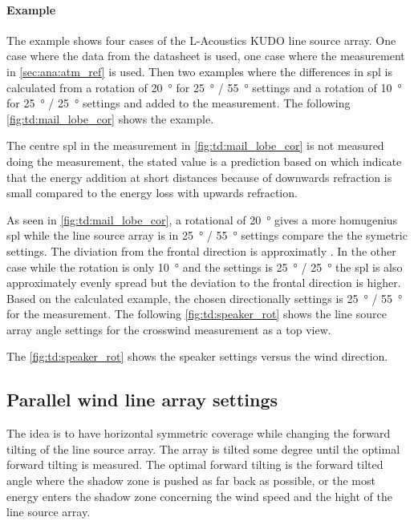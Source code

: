\paragraph{Example} The example shows four cases of the L-Acoustics KUDO line source array. One case where the data from the datasheet is used, one case where the measurement in \autoref{sec:ana:atm_ref} is used. Then two examples where the differences in \gls{spl} is calculated from a rotation of \SI{20}{\degree} for \SI{25}{\degree} / \SI{55}{\degree} settings and a rotation of  \SI{10}{\degree} for \SI{25}{\degree} / \SI{25}{\degree} settings and added to the measurement. The following \autoref{fig:td:mail_lobe_cor} shows the example.



The centre \gls{spl} in the measurement in \autoref{fig:td:mail_lobe_cor} is not measured doing the measurement, the stated value is a prediction based on \citep{review_of_sound} which indicate that the energy addition at short distances because of downwards refraction is small compared to the energy loss with upwards refraction. 

As seen in \autoref{fig:td:mail_lobe_cor}, a rotational of \SI{20}{\degree} gives a more homugenius \gls{spl} while the line source array is in \SI{25}{\degree} / \SI{55}{\degree} settings compare the the symetric settings. The diviation from the frontal direction is approximatly . In the other case while the rotation is only \SI{10}{\degree} and the settings is \SI{25}{\degree} / \SI{25}{\degree} the \gls{spl} is also approximately evenly spread but the deviation to the frontal direction is higher. Based on the calculated example, the chosen directionally settings is \SI{25}{\degree} / \SI{55}{\degree} for the measurement. The following \autoref{fig:td:speaker_rot} shows the line source array angle settings for the crosswind measurement as a top view. 


The \autoref{fig:td:speaker_rot} shows the speaker settings versus the wind direction.

\subsection{Parallel wind line array settings}\label{sub:des:par_set}
The idea is to have horizontal symmetric coverage while changing the forward tilting of the line source array. The array is tilted some degree until the optimal forward tilting is measured. The optimal forward tilting is the forward tilted angle where the shadow zone is pushed as far back as possible, or the most energy enters the shadow zone concerning the wind speed and the hight of the line source array. 



